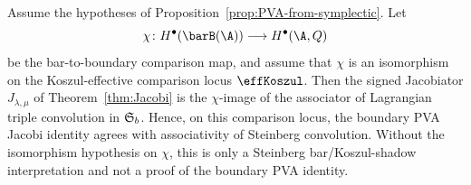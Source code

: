 \begin{proposition}
\label{prop:jacobi-lagrangian-convolution}
Assume the hypotheses of Proposition~\textup{\ref{prop:PVA-from-symplectic}}.
Let
\[
\chi\colon H^\bullet(\barB(\A))\longrightarrow H^\bullet(\A,Q)
\]
be the bar-to-boundary comparison map, and assume that \(\chi\) is an
isomorphism on the Koszul-effective comparison locus \(\effKoszul\).
Then the signed Jacobiator \(J_{\lambda,\mu}\) of
Theorem~\textup{\ref{thm:Jacobi}} is the \(\chi\)-image of the
associator of Lagrangian triple convolution in \(\mathfrak{S}_b\). Hence,
on this comparison locus, the boundary PVA Jacobi identity agrees with
associativity of Steinberg convolution.  Without the isomorphism
hypothesis on \(\chi\), this is only a Steinberg bar/Koszul-shadow
interpretation and not a proof of the boundary PVA identity.
\end{proposition}

